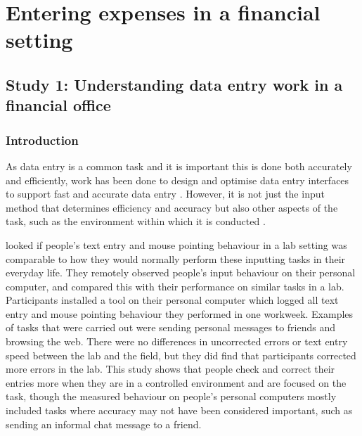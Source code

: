 \documentclass[11pt,oneside]{report}
\begin{document}
\chapter{Entering expenses in a financial setting}\label{ch:Study1}

\section{Study 1: Understanding data entry work in a financial office}\label{ch:Study1}
 
\subsection{Introduction}
As data entry is a common task and it is important this is done both accurately and efficiently, work has been done to design and optimise data entry interfaces to support fast and accurate data entry \citep[e.g.][]{Oladimeji2013, Vertanen2015, Wiseman2013a}.
However, it is not just the input method that determines efficiency and accuracy but also other aspects of the task, such as the environment within which it is conducted \citep{Payne2013, Randall2014}.

\citet{Evans2012} looked if people's text entry and mouse pointing behaviour in a lab setting was comparable to how they would normally perform these inputting tasks in their everyday life. They remotely observed people's input behaviour on their personal computer, and compared this with their performance on similar tasks in a lab. Participants installed a tool on their personal computer which logged all text entry and mouse pointing behaviour they performed in one workweek. Examples of tasks that were carried out were sending personal messages to friends and browsing the web. There were no differences in uncorrected errors or text entry speed between the lab and the field, but they did find that participants corrected more errors in the lab. This study shows that people check and correct their entries more when they are in a controlled environment and are focused on the task, though the measured behaviour on people's personal computers mostly included tasks where accuracy may not have been considered important, such as sending an informal chat message to a friend. 
\end{document}
